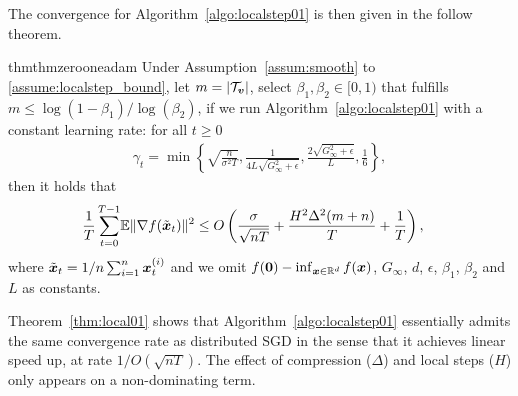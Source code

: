 
The convergence for Algorithm~\ref{algo:localstep01} is then given in the follow theorem.
\begin{restatable}{thm}{thmzerooneadam}
\label{thm:local01}
Under Assumption~\ref{assum:smooth} to \ref{assume:localstep_bound}, let $m=|\mathcal{T}_{\boldsymbol{v}}|$, select $\beta_1,\beta_2\in[0,1)$ that fulfills $m\leq \log(1-\beta_1)/\log(\beta_2)$,
if we run Algorithm~\ref{algo:localstep01} with a constant learning rate: for all $t\geq 0$
\begin{align*}
    \gamma_t = \min\left\{ \sqrt{\frac{n}{\sigma^2T}}, \frac{1}{4L\sqrt{G_\infty^2+\epsilon}},  \frac{2\sqrt{G_\infty^2+\epsilon}}{L},  \frac{1}{6} \right\},
\end{align*}
then it holds that
\begin{align*}
    \frac{1}{T}\sum_{t=0}^{T-1} & \mathbb{E}\|\nabla f(\tilde{\boldsymbol{x}}_t)\|^2 \leq O\left( \frac{\sigma}{\sqrt{nT}} + \frac{H^2\Delta^2(m+n)}{T} +\frac{1}{T}\right),
\end{align*}
where $\tilde{\boldsymbol{x}}_t=1/n\sum_{i=1}^{n}{\boldsymbol{x}}_t^{(i)}$ and we omit $f(\boldsymbol{0})-\inf_{\boldsymbol{x}\in\mathbb{R}^d}f(\boldsymbol{x})$, $G_\infty$, $d$, $\epsilon$, $\beta_1$, $\beta_2$ and $L$ as constants.
\end{restatable}

Theorem~\ref{thm:local01} shows that {\myalgo} Algorithm~\ref{algo:localstep01} essentially admits
the same convergence rate as distributed SGD in the sense that it achieves linear speed up, at rate $1/O(\sqrt{nT})$. The effect of compression ($\Delta$) and local steps ($H$) only appears on a non-dominating term.